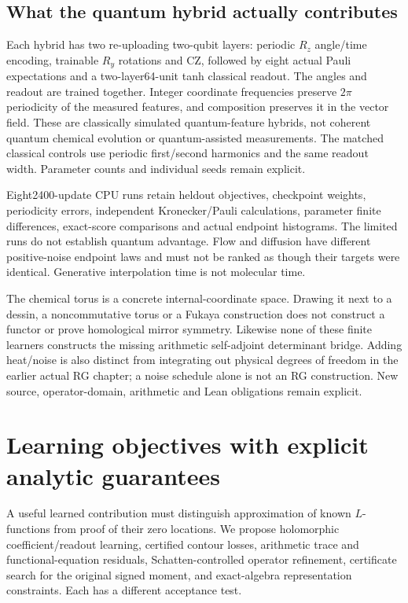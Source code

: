 \documentclass[11pt]{article}
\theoremstyle{definition}\newtheorem{definition}[theorem]{Definition}
\theoremstyle{remark}\newtheorem{remark}[theorem]{Remark}
\begin{document}
\subsection{What the quantum hybrid actually contributes}
Each hybrid has two re-uploading two-qubit layers: periodic $R_z$ angle/time
encoding, trainable $R_y$ rotations and CZ, followed by eight actual Pauli
expectations and a two-layer64-unit tanh classical readout. The angles and
readout are trained together. Integer coordinate frequencies preserve
$2\pi$ periodicity of the measured features, and composition preserves it in
the vector field. These are classically simulated quantum-feature hybrids,
not coherent quantum chemical evolution or quantum-assisted measurements.
The matched classical controls use periodic first/second harmonics and the
same readout width. Parameter counts and individual seeds remain explicit.

Eight2400-update CPU runs retain heldout objectives, checkpoint weights,
periodicity errors, independent Kronecker/Pauli calculations, parameter
finite differences, exact-score comparisons and actual endpoint histograms.
The limited runs do not establish quantum advantage. Flow and diffusion have
different positive-noise endpoint laws and must not be ranked as though their
targets were identical. Generative interpolation time is not molecular time.

The chemical torus is a concrete internal-coordinate space. Drawing it next
to a dessin, a noncommutative torus or a Fukaya construction does not construct
a functor or prove homological mirror symmetry. Likewise none of these finite
learners constructs the missing arithmetic self-adjoint determinant bridge.
Adding heat/noise is also distinct from integrating out physical degrees of
freedom in the earlier actual RG chapter; a noise schedule alone is not an RG
construction. New source, operator-domain, arithmetic and Lean obligations remain explicit.

\section{Learning objectives with explicit analytic guarantees}
A useful learned contribution must distinguish approximation of known
$L$-functions from proof of their zero locations. We propose holomorphic
coefficient/readout learning, certified contour losses, arithmetic trace and
functional-equation residuals, Schatten-controlled operator refinement,
certificate search for the original signed moment, and exact-algebra
representation constraints. Each has a different acceptance test.
\end{document}
